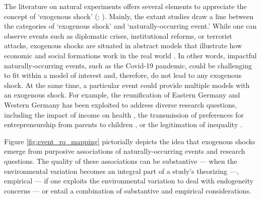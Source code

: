 \documentclass[11pt]{article}
\begin{document}
\begin{refsection}
\noindent The literature on natural experiments offers several elements to
appreciate the concept of `exogenous shock' (\cite[for an overview
of the natural experiment design, see for example][]{withers_li_2021,
dunning_2012,craig_et_al_2017,keele_et_al_2016}; \cite[for a review of the
application of this design, see][]{sekhon_titiunik_2012,sieweke_santoni_2020,
roseinzweig_et_al_2000}). Mainly, the extant studies draw a line between the categories of
`exogenous shock' and `naturally-occurring event.' While one can observe
events such as diplomatic crises, institutional reforms, or terrorist attacks,
exogenous shocks are situated in abstract models that illustrate how economic
and social formations work in the real world \autocite{morgan_2012}. In other
words, impactful naturally-occurring events, such as the Covid-19 
pandemic, could be challenging to fit within a model of interest and, therefore,
do not lead to any exogenous shock. At the same time, a particular event could
provide multiple models with an exogenous shock.  For example, the reunification
of Eastern Germany and Western Germany has been exploited to address diverse
research questions, including the impact of income on health
\autocite[e.g.,][]{frijters_et_al_2004}, the transmission of preferences for
entrepreneurship from parents to children \autocite[e.g.,][]{wyrwich_2015}, or
the legitimation of inequality \autocite[e.g.,][]{haack_sieweke_2018}.

Figure \ref{fig:event_rq_mapping} pictorially depicts the idea that exogenous 
shocks emerge from purposive associations of naturally-occurring events
and research questions. The quality of these associations can be substantive 
--- when the environmental variation becomes an integral part of a study's 
theorizing ---, empirical --- if one exploits the environmental variation to deal with
endogeneity concerns --- or entail a combination of substantive and
empirical considerations.

\vspace{2em}


\end{refsection}
\end{document}

